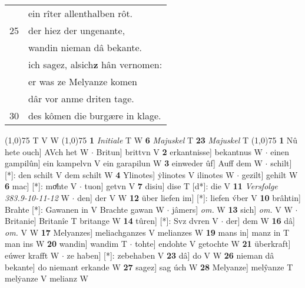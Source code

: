 \documentclass[8pt,a4paper,notitlepage]{article}
\begin{document}
\begin{table}[ht]
\begin{minipage}[t]{0.5\linewidth}
\begin{tabular}{rl}
 & ein rîter allenthalben rôt.\\ 
25 & der hiez der ungenante,\\ 
 & wandin nieman dâ bekante.\\ 
 & ich sagez, alsich\textbf{z} hân vernomen:\\ 
 & er was ze Melyanze komen\\ 
 & dâr vor anme driten tage.\\ 
30 & des kômen die burgære in klage.\\ 
\end{tabular}
\scriptsize
\line(1,0){75} \newline
T V W \newline
\line(1,0){75} \newline
\textbf{1} \textit{Initiale} T W  \textbf{6} \textit{Majuskel} T  \textbf{23} \textit{Majuskel} T  \newline
\line(1,0){75} \newline
\textbf{1} Nû hete ouch] AVch het W  $\cdot$ Britun] brittvn V \textbf{2} erkantnisse] bekantnus W  $\cdot$ einen gampilûn] ein kampelvn V ein garapilun W \textbf{3} einweder ûf] Auff dem W  $\cdot$ schilt] [*]: den schilt V dem schilt W \textbf{4} Ylinotes] ẏlinotes V ilinotes W  $\cdot$ gezilt] gehilt W \textbf{6} mac] [*]: moͤhte V  $\cdot$ tuon] getvn V \textbf{7} disiu] dise T [d*]: die V \textbf{11} \textit{Versfolge 383.9-10-11-12} W   $\cdot$ den] der V W \textbf{12} über liefen im] [*]: liefen v́ber V \textbf{10} brâhtin] Brahte [*]: Gawanen in V Brachte gawan W  $\cdot$ jâmers] \textit{om.} W \textbf{13} sich] \textit{om.} V W  $\cdot$ Britanie] Britanîe T britange W \textbf{14} tûren] [*]: Svz dvren V  $\cdot$ der] dem W \textbf{16} dâ] \textit{om.} V W \textbf{17} Melyanzes] meliachganzes V melianzes W \textbf{19} mans in] manz in T man ins W \textbf{20} wandin] wandim T  $\cdot$ tohte] endohte V getochte W \textbf{21} überkraft] eúwer krafft W  $\cdot$ ze haben] [*]: zebehaben V \textbf{23} dâ] do V W \textbf{26} nieman dâ bekante] do niemant erkande W \textbf{27} sagez] sag úch W \textbf{28} Melyanze] melŷanze T melẏanze V melianz W \newline
\end{minipage}
\end{table}
\end{document}
